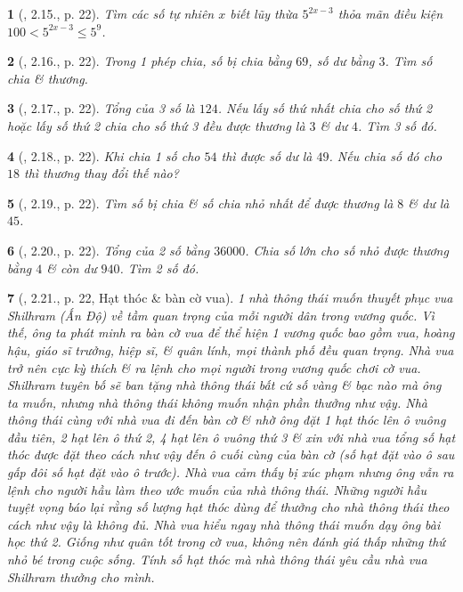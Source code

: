 \documentclass{article}
\newtheorem{baitoan}{}
\begin{document}
\begin{baitoan}[\cite{Binh_boi_duong_Toan_6_tap_1}, 2.15., p. 22]
	Tìm các số tự nhiên $x$ biết lũy thừa $5^{2x - 3}$ thỏa mãn điều kiện $100 < 5^{2x - 3}\le5^9$.
\end{baitoan}

\begin{baitoan}[\cite{Binh_boi_duong_Toan_6_tap_1}, 2.16., p. 22]
	Trong 1 phép chia, số bị chia bằng $69$, số dư bằng $3$. Tìm số chia \& thương.
\end{baitoan}

\begin{baitoan}[\cite{Binh_boi_duong_Toan_6_tap_1}, 2.17., p. 22]
	Tổng của 3 số là $124$. Nếu lấy số thứ nhất chia cho số thứ 2 hoặc lấy số thứ 2 chia cho số thứ 3 đều được thương là $3$ \& dư $4$. Tìm 3 số đó.
\end{baitoan}

\begin{baitoan}[\cite{Binh_boi_duong_Toan_6_tap_1}, 2.18., p. 22]
	Khi chia 1 số cho $54$ thì được số dư là $49$. Nếu chia số đó cho $18$ thì thương thay đổi thế nào?
\end{baitoan}

\begin{baitoan}[\cite{Binh_boi_duong_Toan_6_tap_1}, 2.19., p. 22]
	Tìm số bị chia \& số chia nhỏ nhất để được thương là $8$ \& dư là $45$.
\end{baitoan}

\begin{baitoan}[\cite{Binh_boi_duong_Toan_6_tap_1}, 2.20., p. 22]
	Tổng của 2 số bằng $36000$. Chia số lớn cho số nhỏ được thương bằng $4$ \& còn dư $940$. Tìm 2 số đó.
\end{baitoan}

\begin{baitoan}[\cite{Binh_boi_duong_Toan_6_tap_1}, 2.21., p. 22, Hạt thóc \& bàn cờ vua]
	1 nhà thông thái muốn thuyết phục vua Shilhram (Ấn Độ) về tầm quan trọng của mỗi người dân trong vương quốc. Vì thế, ông ta phát minh ra bàn cờ vua để thể hiện 1 vương quốc bao gồm vua, hoàng hậu, giáo sĩ trưởng, hiệp sĩ, \& quân lính, mọi thành phố đều quan trọng. Nhà vua trở nên cực kỳ thích \& ra lệnh cho mọi người trong vương quốc chơi cờ vua. Shilhram tuyên bố sẽ ban tặng nhà thông thái bất cứ số vàng \& bạc nào mà ông ta muốn, nhưng nhà thông thái không muốn nhận phần thưởng như vậy. Nhà thông thái cùng với nhà vua đi đến bàn cờ \& nhờ ông đặt 1 hạt thóc lên ô vuông đầu tiên, 2 hạt lên ô thứ 2, 4 hạt lên ô vuông thứ 3 \& xin với nhà vua tổng số hạt thóc được đặt theo cách như vậy đến ô cuối cùng của bàn cờ (số hạt đặt vào ô sau gấp đôi số hạt đặt vào ô trước). Nhà vua cảm thấy bị xúc phạm nhưng ông vẫn ra lệnh cho người hầu làm theo ước muốn của nhà thông thái. Những người hầu tuyệt vọng báo lại rằng số lượng hạt thóc dùng để thưởng cho nhà thông thái theo cách như vậy là không đủ. Nhà vua hiểu ngay nhà thông thái muốn dạy ông bài học thứ 2. Giống như quân tốt trong cờ vua, không nên đánh giá thấp những thứ nhỏ bé trong cuộc sống. Tính số hạt thóc mà nhà thông thái yêu cầu nhà vua Shilhram thưởng cho mình.
\end{baitoan}
\end{document}
